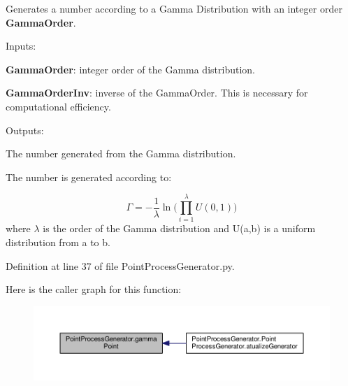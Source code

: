 Generates a number according to a Gamma Distribution with an integer order {\bfseries Gamma\+Order}. 


\begin{DoxyItemize}
\item Inputs\+:
\begin{DoxyItemize}
\item {\bfseries Gamma\+Order}\+: integer order of the Gamma distribution.
\item {\bfseries Gamma\+Order\+Inv}\+: inverse of the Gamma\+Order. This is necessary for computational efficiency.
\end{DoxyItemize}
\item Outputs\+:
\begin{DoxyItemize}
\item The number generated from the Gamma distribution.
\end{DoxyItemize}
\end{DoxyItemize}

The number is generated according to\+:

\begin{equation} \Gamma = -\frac{1}{\lambda}\ln(\limits\prod_{i=1}^{\lambda} U(0,1)) \end{equation} where $\lambda$ is the order of the Gamma distribution and U(a,b) is a uniform distribution from a to b. 

Definition at line 37 of file Point\+Process\+Generator.\+py.



Here is the caller graph for this function\+:\nopagebreak
\begin{figure}[H]
\begin{center}
\leavevmode
\includegraphics[width=350pt]{namespace_point_process_generator_a01488b4f69653d1fb9653b7a8d37744e_icgraph}
\end{center}
\end{figure}


